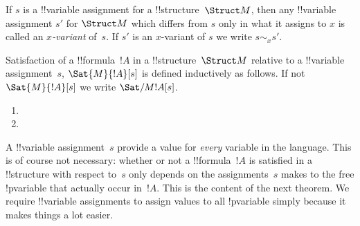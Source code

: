 \documentclass[../../include/open-logic-section]{subfiles}
\begin{document}
\begin{defn}[$x$-Variant]
If $s$ is a !!{variable} assignment for a !!{structure}~$\Struct M$, then any
!!{variable} assignment $s'$ for $\Struct M$ which differs from $s$ only
in what it assigns to $x$ is called an \emph{$x$-variant} of~$s$.  If
$s'$ is an $x$-variant of $s$ we write $s \sim_x s'$.
\end{defn}

\begin{defn}[Satisfaction]
Satisfaction of a !!{formula}~$!A$ in a !!{structure}~$\Struct M$ relative to
a !!{variable} assignment~$s$, $\Sat{M}{!A}[s]$ is defined inductively as
follows. If not $\Sat{M}{!A}[s]$ we write $\Sat/{M}{!A}[s]$.
\begin{enumerate}


\item {}

\item {}






\end{enumerate}
\end{defn}

\begin{explain}
A !!{variable} assignment~$s$ provide a value for \emph{every} variable in
the language. This is of course not necessary: whether or not a
!!{formula}~$!A$ is satisfied in a !!{structure} with respect to~$s$ only
depends on the assignments~$s$ makes to the free !p{variable} that
actually occur in~$!A$.  This is the content of the next theorem.  We
require !!{variable} assignments to assign values to all !p{variable} simply
because it makes things a lot easier.
\end{explain}
\end{document}
